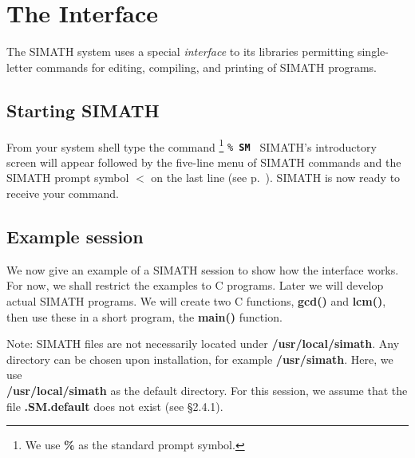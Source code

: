% 
% 

\chapter{The Interface}

The SIMATH system uses a special {\em interface\/} to its libraries
permitting single-letter commands for editing, compiling, and printing of
SIMATH programs.


\section{Starting SIMATH}
From your system shell type the command
\footnote{We use {\bf \%} as the standard prompt symbol.}
\leer
{\tt \% {\bf SM}\/  \care} 
\leer
SIMATH's introductory screen will appear followed by
the five-line menu of SIMATH commands and the SIMATH prompt symbol $<$ on
the last line (see p.~\pageref{SMintro}). SIMATH is now ready to receive your command.



\section{Example session}
We now give an example of a SIMATH session to show how the interface works.
For now, we shall restrict the examples to C programs. Later we will develop
actual SIMATH programs. We 
will create two C functions, {\bf gcd()} and {\bf lcm()}, then use these in a 
short program, the {\bf main()} function.

Note: SIMATH files are not necessarily located under {\bf /usr/local/simath}.
Any directory can be chosen upon installation, for example 
{\bf /usr/simath}. Here, we use \\
{\bf /usr/local/simath} as the default directory.
For this session, we assume that the file {\bf .SM.default} does not exist
(see \S 2.4.1).

